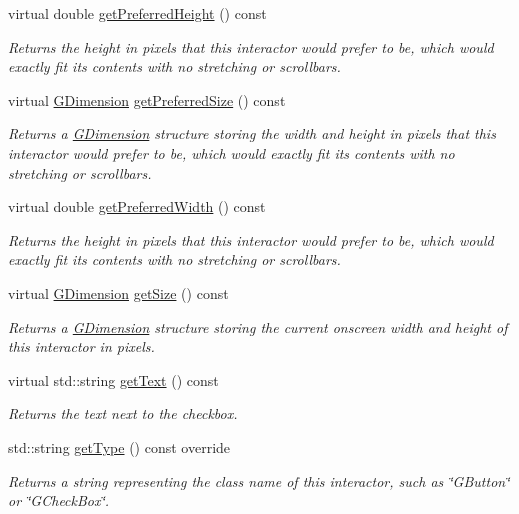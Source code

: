 \begin{DoxyCompactItemize}
virtual double \mbox{\hyperlink{classGInteractor_a747de0961653847bdc6615dbf756d715}{get\+Preferred\+Height}} () const
\begin{DoxyCompactList}\small\item\em Returns the height in pixels that this interactor would prefer to be, which would exactly fit its contents with no stretching or scrollbars. \end{DoxyCompactList}\item 
virtual \mbox{\hyperlink{structGDimension}{G\+Dimension}} \mbox{\hyperlink{classGInteractor_a4aabbee761d8e9116275401131b7ccd1}{get\+Preferred\+Size}} () const
\begin{DoxyCompactList}\small\item\em Returns a \mbox{\hyperlink{structGDimension}{G\+Dimension}} structure storing the width and height in pixels that this interactor would prefer to be, which would exactly fit its contents with no stretching or scrollbars. \end{DoxyCompactList}\item 
virtual double \mbox{\hyperlink{classGInteractor_a82bca31d37700fb0e35d2743352efd5e}{get\+Preferred\+Width}} () const
\begin{DoxyCompactList}\small\item\em Returns the height in pixels that this interactor would prefer to be, which would exactly fit its contents with no stretching or scrollbars. \end{DoxyCompactList}\item 
virtual \mbox{\hyperlink{structGDimension}{G\+Dimension}} \mbox{\hyperlink{classGInteractor_a7b4eec96a2bdc6420695d5796a78eea9}{get\+Size}} () const
\begin{DoxyCompactList}\small\item\em Returns a \mbox{\hyperlink{structGDimension}{G\+Dimension}} structure storing the current onscreen width and height of this interactor in pixels. \end{DoxyCompactList}\item 
virtual std\+::string \mbox{\hyperlink{classGCheckBox_aff553c50924b836c29f146ed34a7c6ec}{get\+Text}} () const
\begin{DoxyCompactList}\small\item\em Returns the text next to the checkbox. \end{DoxyCompactList}\item 
std\+::string \mbox{\hyperlink{classGCheckBox_a9b72ede4ee8520f987a0c01e30654814}{get\+Type}} () const override
\begin{DoxyCompactList}\small\item\em Returns a string representing the class name of this interactor, such as \char`\"{}\+G\+Button\char`\"{} or \char`\"{}\+G\+Check\+Box\char`\"{}. \end{DoxyCompactList}\item 

\end{DoxyCompactItemize}
